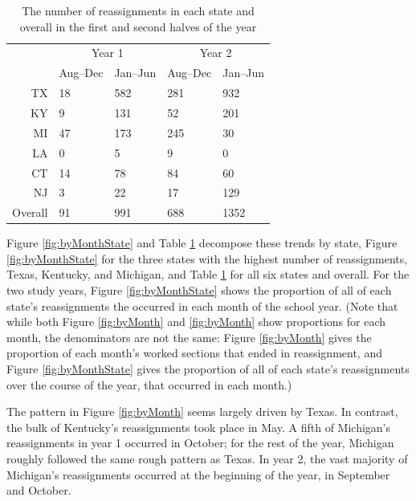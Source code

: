 \documentclass[12pt]{article}\usepackage[]{graphicx}\usepackage[]{color}
\begin{document}
\begin{table}
  \centering
  \begin{tabular}{rll|ll}
    &\multicolumn{2}{c}{Year 1}&\multicolumn{2}{c}{Year 2}\\
    &Aug--Dec&Jan--Jun&Aug--Dec&Jan--Jun\\
 TX &  18 & 582 & 281 & 932 \\ 
  KY &   9 & 131 &  52 & 201 \\ 
  MI &  47 & 173 & 245 &  30 \\ 
  LA &   0 &   5 &   9 &   0 \\ 
  CT &  14 &  78 &  84 &  60 \\ 
  NJ &   3 &  22 &  17 & 129 \\ 
   \hline
Overall &  91 & 991 & 688 & 1352 \\ 
  
\hline
\end{tabular}
\caption{The number of reassignments in each state and overall in the
  first and second halves of the year}
\label{tab:byMonth}
\end{table}

Figure \ref{fig:byMonthState} and Table \ref{tab:byMonth} decompose
these trends by state, Figure \ref{fig:byMonthState} for
the three states with the highest number of reassignments, Texas,
Kentucky, and Michigan, and Table \ref{tab:byMonth} for all six states
and overall.
For the two study years, Figure \ref{fig:byMonthState} shows the proportion of all of each
state's reassignments the occurred in each month of the school year.
(Note that while both Figure \ref{fig:byMonth} and \ref{fig:byMonth}
show proportions for each month, the denominators are not the same:
Figure \ref{fig:byMonth} gives the proportion of each month's worked
sections that ended in reassignment, and Figure \ref{fig:byMonthState}
gives the proportion of all of each state's reassignments over the
course of the year, that occurred in each month.)

The pattern in Figure \ref{fig:byMonth} seems largely driven by Texas.
In contrast, the bulk of Kentucky's reassignments took place in May.
A fifth of Michigan's reassignments in year 1 occurred in October;
for the rest of the year, Michigan roughly followed the same rough pattern as Texas.
In year 2, the vast majority of Michigan's reassignments occurred at
the beginning of the year, in September and October.
\end{document}
